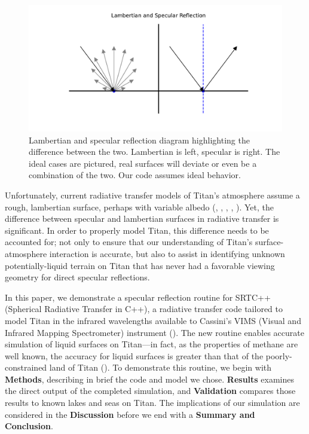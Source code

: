 \documentclass{article}
\begin{document}
\begin{figure}[htbp]
\centering
\includegraphics[scale = 0.55]{LambertSpec.pdf}
\centering
\caption{Lambertian and specular reflection diagram highlighting the difference between the two. Lambertian is left, specular is right. The ideal cases are pictured, real surfaces will deviate or even be a combination of the two. Our code assumes ideal behavior.}
\label{fig:1}
\end{figure}


Unfortunately, current radiative transfer models of Titan's atmosphere assume a rough, lambertian surface, perhaps with variable albedo (\cite{Griffith2012}, \cite{Xu2013}, \cite{Corlies2021}, \cite{Rannou2021}, \cite{EsSayeh2023}). Yet, the difference between specular and lambertian surfaces in radiative transfer is significant. In order to properly model Titan, this difference needs to be accounted for; not only to ensure that our understanding of Titan's surface-atmosphere interaction is accurate, but also to assist in identifying unknown potentially-liquid terrain on Titan that has never had a favorable viewing geometry for direct specular reflections. 

In this paper, we demonstrate a specular reflection routine for SRTC++ (Spherical Radiative Transfer in C++), a radiative transfer code tailored to model Titan in the infrared wavelengths available to Cassini's VIMS (Visual and Infrared Mapping Spectrometer) instrument (\cite{Barnes2018}). The new routine enables accurate simulation of liquid surfaces on Titan---in fact, as the properties of methane are well known, the accuracy for liquid surfaces is greater than that of the poorly-constrained land of Titan (\cite{Trainer2018}). To demonstrate this routine, we begin with \textbf{Methods}, describing in brief the code and model we chose. \textbf{Results} examines the direct output of the completed simulation, and \textbf{Validation} compares those results to known lakes and seas on Titan. The implications of our simulation are considered in the \textbf{Discussion} before we end with a \textbf{Summary and Conclusion}.
\end{document}
